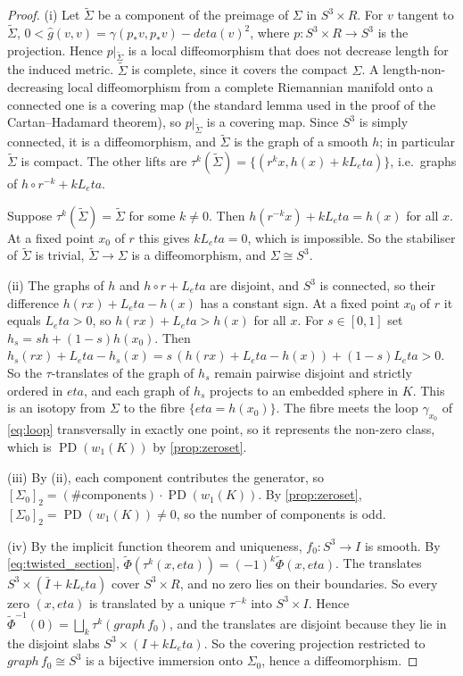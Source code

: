 \documentclass[11pt]{article}
\theoremstyle{canonmath}
\theoremstyle{canonpostulate}
\theoremstyle{canonproposition}
\theoremstyle{canonmath}
\theoremstyle{canonproposition}
\providecommand{\PD}{\operatorname{PD}}
\providecommand{\Klein}{\mathcal{K}}
\providecommand{\R}{\mathbb{R}}
\def\mathrm#1{#1}%
\def\mathbb#1{#1}%
\def\mathcal#1{#1}%
\def\eta{eta}%
\begin{document}
\begin{proof}
(i) Let $\widetilde\Sigma$ be a component of the preimage of $\Sigma$ in $S^3\times\R$. For $v$ tangent to $\widetilde\Sigma$, $0 < \hat{g}(v,v) = \gamma(p_*v,p_*v) - d\eta(v)^2$, where $p: S^3\times\R \to S^3$ is the projection. Hence $p|_{\widetilde\Sigma}$ is a local diffeomorphism that does not decrease length for the induced metric. $\widetilde\Sigma$ is complete, since it covers the compact $\Sigma$. A length-non-decreasing local diffeomorphism from a complete Riemannian manifold onto a connected one is a covering map (the standard lemma used in the proof of the Cartan--Hadamard theorem), so $p|_{\widetilde\Sigma}$ is a covering map. Since $S^3$ is simply connected, it is a diffeomorphism, and $\widetilde\Sigma$ is the graph of a smooth $h$; in particular $\widetilde\Sigma$ is compact. The other lifts are $\tau^k(\widetilde\Sigma) = \{(r^kx, h(x) + kL_\eta)\}$, i.e.\ graphs of $h\circ r^{-k} + kL_\eta$.

Suppose $\tau^k(\widetilde\Sigma) = \widetilde\Sigma$ for some $k\neq 0$. Then $h(r^{-k}x) + kL_\eta = h(x)$ for all $x$. At a fixed point $x_0$ of $r$ this gives $kL_\eta = 0$, which is impossible. So the stabiliser of $\widetilde\Sigma$ is trivial, $\widetilde\Sigma\to\Sigma$ is a diffeomorphism, and $\Sigma\cong S^3$.

(ii) The graphs of $h$ and $h\circ r + L_\eta$ are disjoint, and $S^3$ is connected, so their difference $h(rx) + L_\eta - h(x)$ has a constant sign. At a fixed point $x_0$ of $r$ it equals $L_\eta > 0$, so $h(rx) + L_\eta > h(x)$ for all $x$. For $s\in[0,1]$ set $h_s = s h + (1-s)h(x_0)$. Then $h_s(rx) + L_\eta - h_s(x) = s\,(h(rx) + L_\eta - h(x)) + (1-s)L_\eta > 0$. So the $\tau$-translates of the graph of $h_s$ remain pairwise disjoint and strictly ordered in $\eta$, and each graph of $h_s$ projects to an embedded sphere in $\Klein$. This is an isotopy from $\Sigma$ to the fibre $\{\eta = h(x_0)\}$. The fibre meets the loop $\gamma_{x_0}$ of \eqref{eq:loop} transversally in exactly one point, so it represents the non-zero class, which is $\PD(w_1(\Klein))$ by \cref{prop:zeroset}.

(iii) By (ii), each component contributes the generator, so $[\Sigma_0]_2 = (\#\text{components})\cdot\PD(w_1(\Klein))$. By \cref{prop:zeroset}, $[\Sigma_0]_2 = \PD(w_1(\Klein))\ne 0$, so the number of components is odd.

(iv) By the implicit function theorem and uniqueness, $f_0: S^3\to I$ is smooth. By \eqref{eq:twisted_section}, $\widetilde\Phi(\tau^k(x,\eta)) = (-1)^k\widetilde\Phi(x,\eta)$. The translates $S^3\times(\bar I+kL_\eta)$ cover $S^3\times\R$, and no zero lies on their boundaries. So every zero $(x,\eta)$ is translated by a unique $\tau^{-k}$ into $S^3\times I$. Hence $\widetilde\Phi^{-1}(0) = \bigsqcup_k\tau^k(\mathrm{graph}\,f_0)$, and the translates are disjoint because they lie in the disjoint slabs $S^3\times(I+kL_\eta)$. So the covering projection restricted to $\mathrm{graph}\,f_0\cong S^3$ is a bijective immersion onto $\Sigma_0$, hence a diffeomorphism.


\end{proof}
\end{document}
